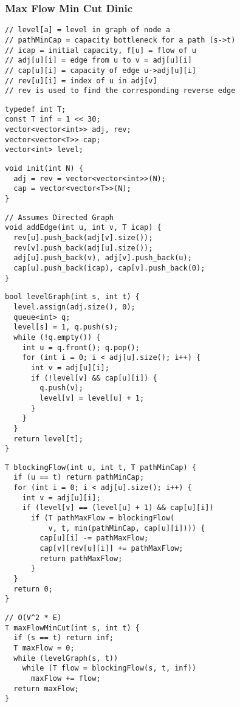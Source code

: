 \documentclass[twoside]{article}
\begin{document}
\begin{multicols*}{2}
\subsubsection*{Max Flow Min Cut Dinic}
\begin{verbatim}
// level[a] = level in graph of node a
// pathMinCap = capacity bottleneck for a path (s->t)
// icap = initial capacity, f[u] = flow of u
// adj[u][i] = edge from u to v = adj[u][i]
// cap[u][i] = capacity of edge u->adj[u][i]
// rev[u][i] = index of u in adj[v]
// rev is used to find the corresponding reverse edge
\end{verbatim}
\vspace{-12pt}
\begin{verbatim}
typedef int T;
const T inf = 1 << 30;
vector<vector<int>> adj, rev;
vector<vector<T>> cap;
vector<int> level;
\end{verbatim}
\vspace{-12pt}
\begin{verbatim}
void init(int N) {
  adj = rev = vector<vector<int>>(N);
  cap = vector<vector<T>>(N);
}
\end{verbatim}
\vspace{-12pt}
\begin{verbatim}
// Assumes Directed Graph
void addEdge(int u, int v, T icap) {
  rev[u].push_back(adj[v].size());
  rev[v].push_back(adj[u].size());
  adj[u].push_back(v), adj[v].push_back(u);
  cap[u].push_back(icap), cap[v].push_back(0);
}
\end{verbatim}
\vspace{-12pt}
\begin{verbatim}
bool levelGraph(int s, int t) {
  level.assign(adj.size(), 0);
  queue<int> q;
  level[s] = 1, q.push(s);
  while (!q.empty()) {
    int u = q.front(); q.pop();
    for (int i = 0; i < adj[u].size(); i++) {
      int v = adj[u][i];
      if (!level[v] && cap[u][i]) {
        q.push(v);
        level[v] = level[u] + 1;
      }
    }
  }
  return level[t];
}
\end{verbatim}
\vspace{-12pt}
\begin{verbatim}
T blockingFlow(int u, int t, T pathMinCap) {
  if (u == t) return pathMinCap;
  for (int i = 0; i < adj[u].size(); i++) {
    int v = adj[u][i];
    if (level[v] == (level[u] + 1) && cap[u][i])
      if (T pathMaxFlow = blockingFlow(
          v, t, min(pathMinCap, cap[u][i]))) {
        cap[u][i] -= pathMaxFlow;
        cap[v][rev[u][i]] += pathMaxFlow;
        return pathMaxFlow;
      }
  }
  return 0;
}
\end{verbatim}
\vspace{-12pt}
\begin{verbatim}
// O(V^2 * E)
T maxFlowMinCut(int s, int t) {
  if (s == t) return inf;
  T maxFlow = 0;
  while (levelGraph(s, t))
    while (T flow = blockingFlow(s, t, inf))
      maxFlow += flow;
  return maxFlow;
}
\end{verbatim}


\end{multicols*}
\end{document}

